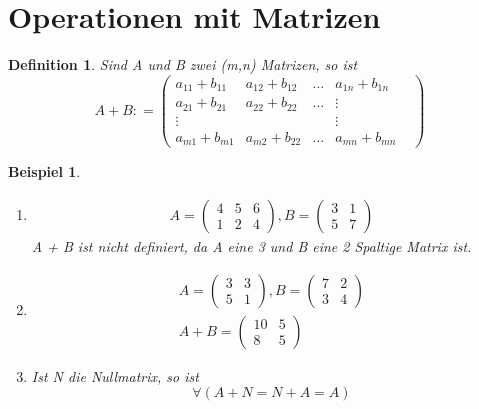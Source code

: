 \documentclass[a4paper,10pt]{report}
\newtheorem{mydef}{Definition}
\newtheorem{myexample}{Beispiel}
\begin{document}
\section{Operationen mit Matrizen}
\begin{mydef}
	Sind A und B zwei (m,n) Matrizen, so  ist 
	\begin{equation*}
		A+B : = \begin{pmatrix}a_{11}+b_{11}&a_{12}+b_{12}& \ldots& a_{1n}+b_{1n}\\ a_{21}+b_{21}& a_{22}+b_{22} &\ldots& \vdots\\\vdots&&&\vdots&\\a_{m1}+b_{m1}& a_{m2}+b_{22}&\ldots&a_{mn}+b_{mn}\end{pmatrix}
	\end{equation*}
\end{mydef}
\begin{myexample}
	\begin{enumerate}
	\item
	\begin{eqnarray*}
		A = \begin{pmatrix}4&5&6\\1&2&4\end{pmatrix}, B = \begin{pmatrix}3&1\\5&7\end{pmatrix}
	\end{eqnarray*}
	A + B ist nicht definiert, da A eine 3 und B eine 2 Spaltige Matrix ist.
	\item
	\begin{eqnarray*}
		A = \begin{pmatrix}3&3\\5&1\end{pmatrix}, B = \begin{pmatrix}7&2\\3&4\end{pmatrix}\\
		A+B = \begin{pmatrix}10&5\\8&5\end{pmatrix}
	\end{eqnarray*}
	\item
	Ist N die Nullmatrix, so ist
	\begin{equation*}\forall (A+N = N+A=A)\end{equation*}
	\end{enumerate}
\end{myexample}
\end{document}
